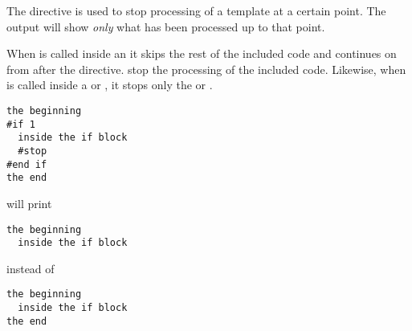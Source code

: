 The  directive is used to stop processing of a template at a
certain point.  The output will show {\em only} what has been processed up to
that point.  

When  is called inside an  it skips the rest of
the included code and continues on from after the  directive.
stop the processing of the included code.  Likewise, when  is
called inside a  or , it stops only the 
or .

\begin{verbatim}
the beginning
#if 1
  inside the if block
  #stop
#end if
the end
\end{verbatim}

will print 
\begin{verbatim}
the beginning
  inside the if block
\end{verbatim}

instead of 
\begin{verbatim}
the beginning
  inside the if block
the end
\end{verbatim}




